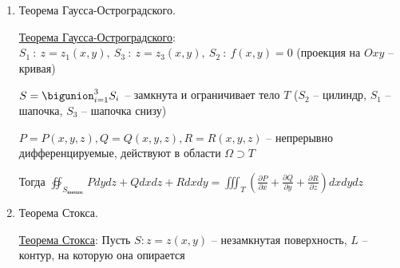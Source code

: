 \documentclass[12pt]{article}
\begin{document}
\begin{enumerate}
        \hyperlink{surfaceintegralofsecondkindproperties}{Свойства}: Меняет знак при смене обхода с $\vec{n}^+$ на $\vec{n}^-$

        \hyperlink{surfaceintegralofsecondkindcalculation}{Вычисление}:

        \begin{enumerate}
            \item Параметризация $S$ \quad для $\iint Rdxdy \quad z = z(x, y)$, для $\iint Qdxdz \quad y = y(x, z)$,

            для $\iint Pdydz \quad x = x(y, z)$

            Пределы интегрирования $D_{xy} = \text{проек.}_{Oxy} S$ и т. д.

            \item $dxdy \to \pm dxdy$, если обход $D_{xy}$ в направлении против часовой стрелки ($+dxdy$, если угол между $\vec{n}$ и $Oz$ острый, иначе $-dxdy$)

            \item $R(x, y, z) = \tilde{R}(x, y, z(x, y)), P(x, y, z) = \tilde{P}(y, z), Q(x, y, z) = \tilde{Q}(x, z)$

            \item $\iint_{S^{\vec{n}}} f(x, y, z) dxdy = \iint_{D_{xy}} \pm \tilde{P}dydz \pm \tilde{Q}dxdz \pm \tilde{R}dxdy$
        \end{enumerate}

        \item Теорема Гаусса-Остроградского.

        \hyperlink{theoremGaussOstrogradskyy}{Теорема Гаусса-Остроградского}:
        $S_1\ : \ z = z_1(x, y),\ S_3\ :\ z = z_3(x, y),\ S_2\ : \ f(x, y) = 0$ (проекция на $Oxy$ -- кривая)

        $S = \bigunion_{i = 1}^3 S_i$ -- замкнута и ограничивает тело $T$ ($S_2$ -- цилиндр, $S_1$ -- шапочка, $S_3$ -- шапочка снизу)

        $P = P(x, y, z), Q = Q(x, y, z), R = R(x, y, z)$ -- непрерывно дифференцируемые, действуют в области $\Omega \supset T$

        Тогда $\oiint_{S_{\text{внешн.}}} Pdydz + Qdxdz + Rdxdy = \iiint_T \left(\frac{\partial P}{\partial x} + \frac{\partial Q}{\partial y} + \frac{\partial R}{\partial z}\right) dxdydz$


        \item Теорема Стокса.

        \hyperlink{theoremStokes}{Теорема Стокса}: Пусть $S : z = z(x, y)$ -- незамкнутая поверхность, $L$ -- контур, на которую она опирается


\end{enumerate}
\end{document}
